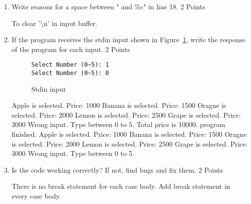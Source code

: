 \begin{enumerate}
\item Write reasons for a space between " and \%c" in line 18. \hfill 2 Points
\begin{solution}{5cm}
To clear '\textbackslash n' in input buffer.
\end{solution}
\clearpage
\item If the program receives the stdin input shown in Figure~\ref{cli_input}, write the response of the program for each input. \hfill 2 Points
\newline
\begin{figure}[h]
\centering
\begin{varwidth}{\linewidth}
\begin{verbatim}
Select Number (0~5): 1
Select Number (0~5): 0
\end{verbatim}
\end{varwidth}
\caption{Stdin input}
\label{cli_input}
\end{figure}
\begin{solution}{5cm}
Apple is selected. Price: 1000\newline
Banana is selected. Price: 1500\newline
Oragne is selected. Price: 2000\newline
Lemon is selected. Price: 2500\newline
Grape is selected. Price: 3000\newline
Wrong input. Type between 0 to 5.\newline
Total price is 10000.\newline
program finished.\newline
Apple is selected. Price: 1000\newline
Banana is selected. Price: 1500\newline
Oragne is selected. Price: 2000\newline
Lemon is selected. Price: 2500\newline
Grape is selected. Price: 3000\newline
Wrong input. Type between 0 to 5.\newline
\end{solution}
\item Is the code working correctly? If not, find bugs and fix them.  \hfill 2 Points
\begin{solution}{5cm}
There is no break statement for each case body.
Add break statement in every case body. \newline\newline

\end{solution}
\end{enumerate}
